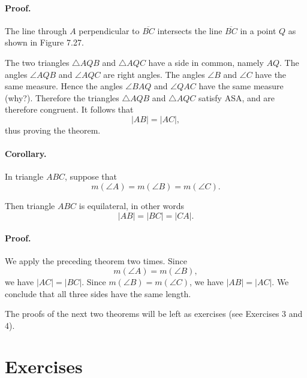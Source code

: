 \documentclass[12pt]{book} %
\begin{document}
\paragraph{Proof.}
The line through $A$ perpendicular to $\overline{BC}$ intersects the line $\overline{BC}$ in a point $Q$ as shown in Figure 7.27.


The two triangles $\triangle AQB$ and $\triangle AQC$ have a side in common, namely $AQ$. The angles $\angle AQB$ and $\angle AQC$ are right angles. The angles $\angle B$ and $\angle C$ have the same measure. Hence the angles $\angle BAQ$ and $\angle QAC$ have the same measure (why?). Therefore the triangles $\triangle AQB$ and $\triangle AQC$ satisfy ASA, and are therefore congruent. It follows that
\[
|AB|=|AC|,
\]
thus proving the theorem.

\paragraph{Corollary.}
In triangle $ABC$, suppose that
\[
m(\angle A)=m(\angle B)=m(\angle C).
\]


Then triangle $ABC$ is equilateral, in other words
\[
|AB|=|BC|=|CA|.
\]

\paragraph{Proof.}
We apply the preceding theorem two times. Since
\[
m(\angle A)=m(\angle B),
\]
we have $|AC|=|BC|$. Since $m(\angle B)=m(\angle C)$, we have $|AB|=|AC|$. We conclude that all three sides have the same length.

The proofs of the next two theorems will be left as exercises (see Exercises 3 and 4).



\section*{Exercises}
\end{document}
